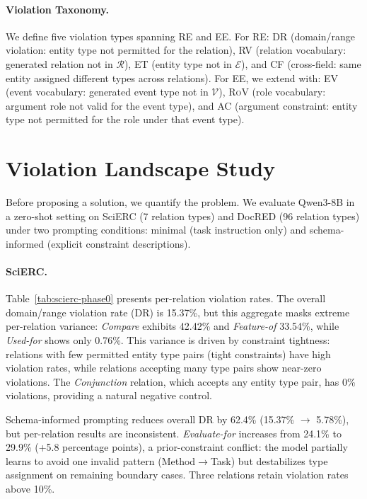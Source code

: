 \documentclass[11pt,a4paper]{article}
\newcommand{\drsym}{\textsc{DR}}
\newcommand{\rvsym}{\textsc{RV}}
\newcommand{\etsym}{\textsc{ET}}
\newcommand{\cfsym}{\textsc{CF}}
\newcommand{\evsym}{\textsc{EV}}
\newcommand{\rovsym}{\textsc{RoV}}
\newcommand{\acsym}{\textsc{AC}}
\begin{document}
\paragraph{Violation Taxonomy.}
We define five violation types spanning RE and EE. For RE: \drsym{} (domain/range violation: entity type not permitted for the relation), \rvsym{} (relation vocabulary: generated relation not in $\mathcal{R}$), \etsym{} (entity type not in $\mathcal{E}$), and \cfsym{} (cross-field: same entity assigned different types across relations). For EE, we extend with: \evsym{} (event vocabulary: generated event type not in $\mathcal{V}$), \rovsym{} (role vocabulary: argument role not valid for the event type), and \acsym{} (argument constraint: entity type not permitted for the role under that event type).

\section{Violation Landscape Study}
\label{sec:landscape}

Before proposing a solution, we quantify the problem. We evaluate Qwen3-8B in a zero-shot setting on SciERC (7 relation types) and DocRED (96 relation types) under two prompting conditions: minimal (task instruction only) and schema-informed (explicit constraint descriptions).

\paragraph{SciERC.}
Table~\ref{tab:scierc-phase0} presents per-relation violation rates. The overall domain/range violation rate (\drsym{}) is 15.37\%, but this aggregate masks extreme per-relation variance: \textit{Compare} exhibits 42.42\% and \textit{Feature-of} 33.54\%, while \textit{Used-for} shows only 0.76\%. This variance is driven by constraint tightness: relations with few permitted entity type pairs (tight constraints) have high violation rates, while relations accepting many type pairs show near-zero violations. The \textit{Conjunction} relation, which accepts any entity type pair, has 0\% violations, providing a natural negative control.

Schema-informed prompting reduces overall \drsym{} by 62.4\% (15.37\% $\to$ 5.78\%), but per-relation results are inconsistent. \textit{Evaluate-for} increases from 24.1\% to 29.9\% (+5.8 percentage points), a prior-constraint conflict: the model partially learns to avoid one invalid pattern (Method$\to$Task) but destabilizes type assignment on remaining boundary cases. Three relations retain violation rates above 10\%.
\end{document}
